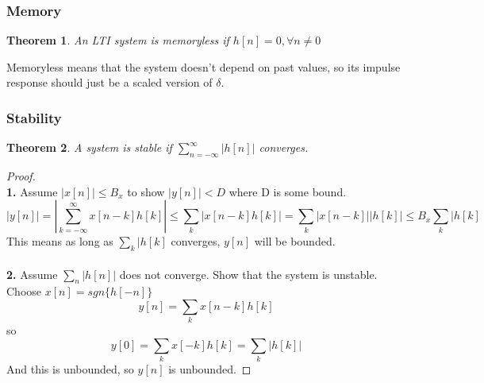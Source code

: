 \documentclass{article}
\newtheorem{theorem}{Theorem}
\newtheorem{proof}{Proof}
\begin{document}
\subsubsection{Memory}
\begin{theorem}
    An LTI system is memoryless if $h[n]=0, \forall n \ne 0$
\end{theorem}
Memoryless means that the system doesn't depend on past values, so its impulse response should
just be a scaled version of $\delta$.
\subsubsection{Stability}
\begin{theorem}
    A system is stable if $\sum_{n=-\infty}^{\infty}{|h[n]|}$ converges.
\end{theorem}
\begin{proof}
    \textbf{\\1. } Assume $|x[n]| \le B_x$ to show $|y[n]| < D$ where D is some bound.
    $$|y[n]| = |\sum_{k=-\infty}^{\infty}{x[n-k]h[k]}| \le \sum_{k}{|x[n-k]h[k]|} = \sum_{k}{|x[n-k]||h[k]|}\le B_x\sum_{k}{|h[k]}$$
    This means as long as $\sum_{k}{|h[k]}$ converges, $y[n]$ will be bounded.\\
    \textbf{\\2. } Assume $\sum_{n}{|h[n]|}$ does not converge. Show that the system is unstable.
    Choose $x[n]=sgn\{h[-n]\}$
    $$y[n]=\sum_{k}{x[n-k]h[k]}$$ so 
    $$y[0] = \sum_{k}{x[-k]h[k]} = \sum_{k}{|h[k]|}$$
    And this is unbounded, so $y[n]$ is unbounded.
\end{proof}
\end{document}
